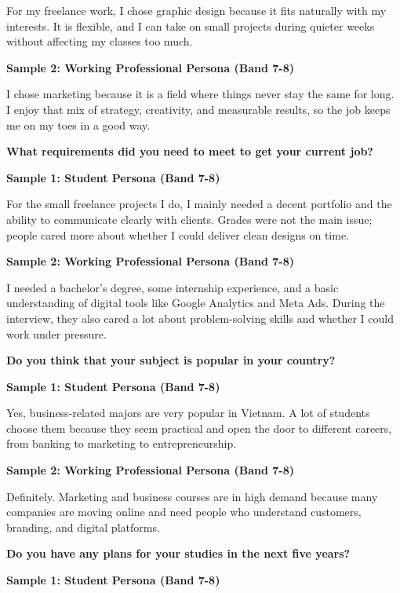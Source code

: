 For my freelance work, I chose graphic design because it fits naturally with my interests. It is flexible, and I can take on small projects during quieter weeks without affecting my classes too much.

\textbf{Sample 2: Working Professional Persona (Band 7-8)}

I chose marketing because it is a field where things never stay the same for long. I enjoy that mix of strategy, creativity, and measurable results, so the job keeps me on my toes in a good way.

\separator

\begin{ieltsquestion}
\textbf{What requirements did you need to meet to get your current job?}
\end{ieltsquestion}
\textbf{Sample 1: Student Persona (Band 7-8)}

For the small freelance projects I do, I mainly needed a decent portfolio and the ability to communicate clearly with clients. Grades were not the main issue; people cared more about whether I could deliver clean designs on time.

\textbf{Sample 2: Working Professional Persona (Band 7-8)}

I needed a bachelor's degree, some internship experience, and a basic understanding of digital tools like Google Analytics and Meta Ads. During the interview, they also cared a lot about problem-solving skills and whether I could work under pressure.

\separator

\begin{ieltsquestion}
\textbf{Do you think that your subject is popular in your country?}
\end{ieltsquestion}
\textbf{Sample 1: Student Persona (Band 7-8)}

Yes, business-related majors are very popular in Vietnam. A lot of students choose them because they seem practical and open the door to different careers, from banking to marketing to entrepreneurship.

\textbf{Sample 2: Working Professional Persona (Band 7-8)}

Definitely. Marketing and business courses are in high demand because many companies are moving online and need people who understand customers, branding, and digital platforms.

\separator

\begin{ieltsquestion}
\textbf{Do you have any plans for your studies in the next five years?}
\end{ieltsquestion}
\textbf{Sample 1: Student Persona (Band 7-8)}

